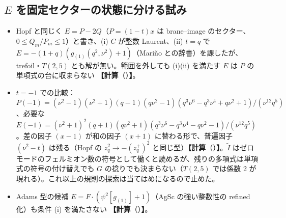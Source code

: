 \documentclass[a4paper,10pt]{ltjsarticle}
\newcommand{\comp}[1]{\textbf{【計算}\if\relax\detokenize{#1}\relax\else（#1）\fi\textbf{】}}
\begin{document}
\subsection{$E$ を固定セクターの状態に分ける試み}
\begin{itemize}
\item Hopf と同じく $E = P - 2Q$（$P = (1-t)x$ は brane--image のセクター、$0 \le Q_m/P_m \le 1$）と書き、(i) $C$ が整数 Laurent、(ii) $t = q$ で $E = -(1+q)(g_{(1)}(q^2, \nu^2) + 1)$（Mariño との辞書）を課したが、trefoil・$T(2,5)$ とも解が無い。範囲を外しても (i)(ii) を満たす $E$ は $P$ の単項式の台に収まらない \comp{}。
\item $t = -1$ での比較：$P(-1) = (\nu^2-1)(\nu^2+1)(q-1)(q\nu^2-1)(q^3\nu^6 - q^3\nu^4 + q\nu^2 + 1)/(\nu^{12}q^5)$、必要な $E(-1) = (\nu^2+1)^2(q+1)(q\nu^2+1)(q^3\nu^6 - q^3\nu^4 - q\nu^2 - 1)/(\nu^{12}q^5)$。差の因子 $(x-1)$ が和の因子 $(x+1)$ に替わる形で、普遍因子 $(\nu^2 - t)$ は残る（Hopf の $z_q^2 \to -(z_q^+)^2$ と同じ型）\comp{}。$\tilde I$ はゼロモードのフェルミオン数の符号として働くと読めるが、残りの多項式は単項式の符号の付け替えでも $G$ の捻りでも決まらない（$T(2,5)$ では係数 2 が現れる）。これ以上の規則の探索は当てはめになるので止めた。
\item Adams 型の候補 $E = F\cdot(\psi^2[g_{(1)}] + 1)$（AgSc の強い整数性の refined 化）も条件 (i) を満たさない \comp{}。
\end{itemize}
\end{document}
